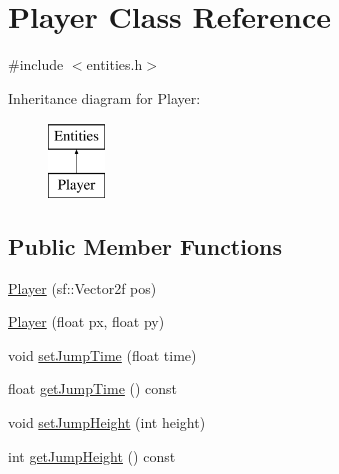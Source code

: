\hypertarget{classPlayer}{\section{Player Class Reference}
\label{classPlayer}
}


{\ttfamily \#include $<$entities.\-h$>$}

Inheritance diagram for Player\-:\begin{figure}[H]
\begin{center}
\leavevmode
\includegraphics[height=2.000000cm]{classPlayer}
\end{center}
\end{figure}
\subsection*{Public Member Functions}
\begin{DoxyCompactItemize}
\item 
\hyperlink{classPlayer_a590f9fa9624d8734027fa2b290fa909e}{Player} (sf\-::\-Vector2f pos)
\item 
\hyperlink{classPlayer_ad2d6910c46e7fdf375870da47ae3db5f}{Player} (float px, float py)
\item 
void \hyperlink{classPlayer_a01c63b9632f8a4f679f2e4cd704f14b9}{set\-Jump\-Time} (float time)
\item 
float \hyperlink{classPlayer_a9165dbc42a8d434d4eb0c64251305855}{get\-Jump\-Time} () const 
\item 
void \hyperlink{classPlayer_aa04cc1ac4ae2b43bfb841929e3d59315}{set\-Jump\-Height} (int height)
\item 
int \hyperlink{classPlayer_a41384c619c72d9cfd1ad6a354e917f8e}{get\-Jump\-Height} () const 
\end{DoxyCompactItemize}



